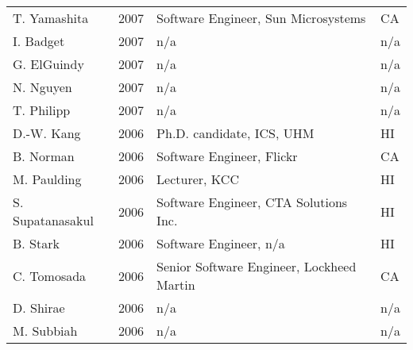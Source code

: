 \documentclass[12pt]{article}
\begin{document}
\begin{tabular}{|l|l|l|l|}
T. Yamashita& 2007 & Software Engineer, Sun Microsystems & CA\\
I. Badget   & 2007 & n/a & n/a\\
G. ElGuindy & 2007 & n/a & n/a\\
N. Nguyen   & 2007 & n/a & n/a\\
T. Philipp  & 2007 & n/a & n/a\\
\hline
D.-W. Kang  & 2006 & Ph.D. candidate, ICS, UHM & HI\\
B. Norman   & 2006 & Software Engineer, Flickr & CA\\
M. Paulding & 2006 & Lecturer, KCC & HI\\
S. Supatanasakul & 2006 & Software Engineer, CTA Solutions Inc. & HI\\
B. Stark    & 2006 & Software Engineer, n/a & HI\\
C. Tomosada & 2006 & Senior Software Engineer, Lockheed Martin & CA\\
D. Shirae   & 2006 & n/a & n/a\\
M. Subbiah  & 2006 & n/a & n/a\\
\hline
\end{tabular}
\clearpage
\end{document}
